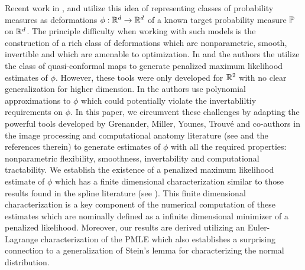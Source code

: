 \documentclass[noinfoline]{imsart}
\begin{document}
%
%
  Recent work in \cite{and:11}, \cite{AnderesNychka} and  \cite{ElMoselhy20127815} utilize  this idea of representing classes of  probability measures as deformations $\phi:\Bbb R^d\rightarrow \Bbb R^d$ of a known target probability measure $\Bbb P$ on $\Bbb R^d$.
 The principle difficulty when working with such models is the construction of a rich class of deformations   which are nonparametric, smooth,  invertible and which are amenable to optimization. In \cite{and:11} and \cite{AnderesNychka} the authors the utilize  the class of quasi-conformal maps to generate penalized maximum likelihood estimates of $\phi$. However, these tools were only developed for $\Bbb R^2$ with no clear generalization for higher dimension.
 In \cite{ElMoselhy20127815} the authors use polynomial approximations to $\phi$ which could potentially violate the invertabliltiy requirements on $\phi$.
In this paper,  we circumvent these challenges by adapting the powerful tools developed by Grenander, Miller,  Younes, Trouv\'e and co-authors in the image processing and computational anatomy literature   (see \cite{you:10} and the references therein) to generate estimates of  $\phi$ with all the required properties: nonparametric flexibility, smoothness, invertability and computational tractability.
We establish the existence of a penalized maximum likelihood estimate of $\phi$  which has a finite dimensional characterization  similar to those results found in the spline literature (see \cite{wahba:90}). This finite dimensional characterization is a key component  of the numerical computation of these estimates which are nominally defined as a infinite  dimensional minimizer of a penalized likelihood. Moreover, our results are derived utilizing  an Euler-Lagrange characterization of the PMLE which also establishes a surprising connection to a generalization of Stein's lemma for characterizing the normal distribution.
\end{document}
